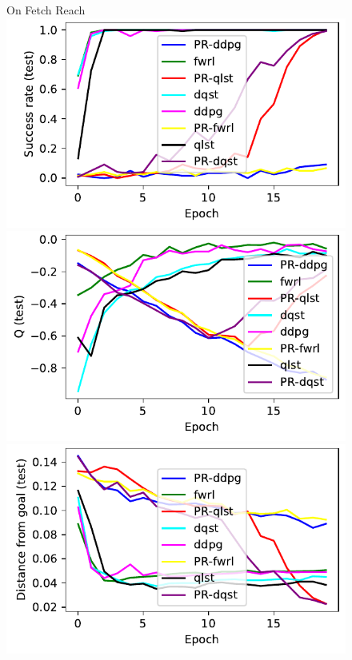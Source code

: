 \begin{figure}%
  \def\frac{0.24}
  On Fetch Reach\\
  \includegraphics[width=\frac\columnwidth]{media/res/245b3c4-ce781a70-FetchReachPR-v1-fwrl-future-her_fwrl_path_reward/test/success_rate.pdf}%
  \includegraphics[width=\frac\columnwidth]{media/res/245b3c4-ce781a70-FetchReachPR-v1-fwrl-future-her_fwrl_path_reward/test/mean_Q.pdf}%
  \includegraphics[width=\frac\columnwidth]{media/res/245b3c4-ce781a70-FetchReachPR-v1-fwrl-future-her_fwrl_path_reward/test/ag_g_dist.pdf}%

\end{figure}
